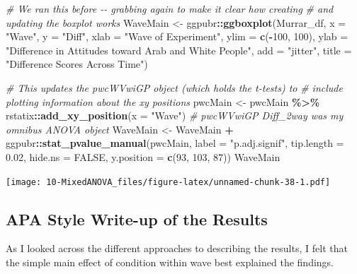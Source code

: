 \documentclass[
  11pt,
]{book}
\newenvironment{Shaded}{\begin{snugshade}}{\end{snugshade}}
\newcommand{\AttributeTok}[1]{\textcolor[rgb]{0.27,0.27,0.27}{#1}}
\newcommand{\CommentTok}[1]{\textcolor[rgb]{0.37,0.37,0.37}{\textit{#1}}}
\newcommand{\ConstantTok}[1]{\textcolor[rgb]{0.37,0.37,0.37}{#1}}
\newcommand{\DecValTok}[1]{\textcolor[rgb]{0.06,0.06,0.06}{#1}}
\newcommand{\FloatTok}[1]{\textcolor[rgb]{0.06,0.06,0.06}{#1}}
\newcommand{\FunctionTok}[1]{\textcolor[rgb]{0.27,0.27,0.27}{\textbf{#1}}}
\newcommand{\NormalTok}[1]{#1}
\newcommand{\OtherTok}[1]{\textcolor[rgb]{0.37,0.37,0.37}{#1}}
\newcommand{\SpecialCharTok}[1]{\textcolor[rgb]{0.43,0.43,0.43}{\textbf{#1}}}
\newcommand{\StringTok}[1]{\textcolor[rgb]{0.5,0.5,0.5}{#1}}
\begin{document}
\begin{Shaded}
\begin{Highlighting}[]
\CommentTok{\# We ran this before {-}{-} grabbing again to make it clear how creating}
\CommentTok{\# and updating the boxplot works}
\NormalTok{WaveMain }\OtherTok{\textless{}{-}}\NormalTok{ ggpubr}\SpecialCharTok{::}\FunctionTok{ggboxplot}\NormalTok{(Murrar\_df, }\AttributeTok{x =} \StringTok{"Wave"}\NormalTok{, }\AttributeTok{y =} \StringTok{"Diff"}\NormalTok{, }\AttributeTok{xlab =} \StringTok{"Wave of Experiment"}\NormalTok{,}
    \AttributeTok{ylim =} \FunctionTok{c}\NormalTok{(}\SpecialCharTok{{-}}\DecValTok{100}\NormalTok{, }\DecValTok{100}\NormalTok{), }\AttributeTok{ylab =} \StringTok{"Difference in Attitudes toward Arab and White People"}\NormalTok{,}
    \AttributeTok{add =} \StringTok{"jitter"}\NormalTok{, }\AttributeTok{title =} \StringTok{"Difference Scores Across Time"}\NormalTok{)}

\CommentTok{\# This updates the pwcWVwiGP object (which holds the t{-}tests) to}
\CommentTok{\# include plotting information about the xy positions}
\NormalTok{pwcMain }\OtherTok{\textless{}{-}}\NormalTok{ pwcMain }\SpecialCharTok{\%\textgreater{}\%}
\NormalTok{    rstatix}\SpecialCharTok{::}\FunctionTok{add\_xy\_position}\NormalTok{(}\AttributeTok{x =} \StringTok{"Wave"}\NormalTok{)}
\CommentTok{\# pwcWVwiGP Diff\_2way was my omnibus ANOVA object}
\NormalTok{WaveMain }\OtherTok{\textless{}{-}}\NormalTok{ WaveMain }\SpecialCharTok{+}\NormalTok{ ggpubr}\SpecialCharTok{::}\FunctionTok{stat\_pvalue\_manual}\NormalTok{(pwcMain, }\AttributeTok{label =} \StringTok{"p.adj.signif"}\NormalTok{,}
    \AttributeTok{tip.length =} \FloatTok{0.02}\NormalTok{, }\AttributeTok{hide.ns =} \ConstantTok{FALSE}\NormalTok{, }\AttributeTok{y.position =} \FunctionTok{c}\NormalTok{(}\DecValTok{93}\NormalTok{, }\DecValTok{103}\NormalTok{, }\DecValTok{87}\NormalTok{))}
\NormalTok{WaveMain}
\end{Highlighting}
\end{Shaded}

\texttt{[image: 10-MixedANOVA\_files/figure-latex/unnamed-chunk-38-1.pdf]}

\hypertarget{apa-style-write-up-of-the-results}{%
\subsection{APA Style Write-up of the Results}\label{apa-style-write-up-of-the-results}}

As I looked across the different approaches to describing the results, I felt that the simple main effect of condition within wave best explained the findings.
\end{document}
